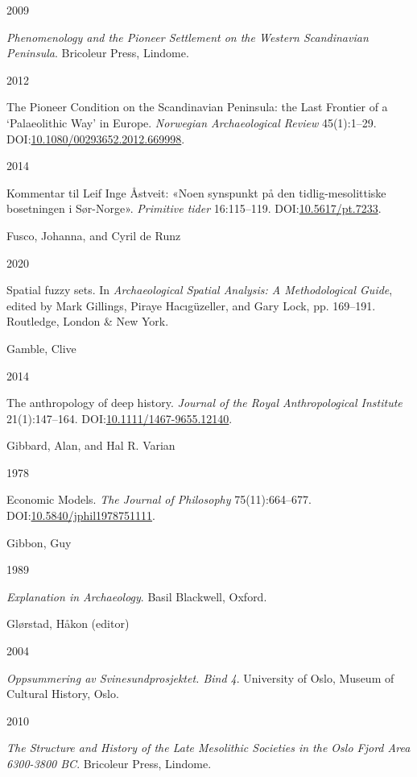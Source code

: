 \documentclass[
  a4paper,
  oneside]{uiophdthesis}
\newlength{\cslhangindent}
\newlength{\csllabelwidth}
\newlength{\cslentryspacingunit} %
\newenvironment{CSLReferences}[2] %
 {%
  \setlength{\parindent}{0pt}
  \ifodd #1
  \let\oldpar\par
  \def\par{\hangindent=\cslhangindent\oldpar}
  \fi
  \setlength{\parskip}{#2\cslentryspacingunit}
 }%
 {}
\newcommand{\CSLBlock}[1]{#1\hfill\break}
\newcommand{\CSLLeftMargin}[1]{\parbox[t]{\csllabelwidth}{#1}}
\newcommand{\CSLRightInline}[1]{\parbox[t]{\linewidth - \csllabelwidth}{#1}\break}
\begin{document}
\begin{CSLReferences}{0}{0}
\leavevmode{}%
\CSLLeftMargin{ 2009 }
\CSLRightInline{\emph{{Phenomenology and the Pioneer Settlement on the Western Scandinavian Peninsula}}. Bricoleur Press, Lindome.}

\leavevmode{}%
\CSLLeftMargin{ 2012 }
\CSLRightInline{{The Pioneer Condition on the Scandinavian Peninsula: the Last Frontier of a {`}Palaeolithic Way{'} in Europe}. \emph{Norwegian Archaeological Review} 45(1):1--29. DOI:\href{https://doi.org/10.1080/00293652.2012.669998}{10.1080/00293652.2012.669998}.}

\leavevmode{}%
\CSLLeftMargin{ 2014 }
\CSLRightInline{{Kommentar til Leif Inge Åstveit: «Noen synspunkt på den tidlig-mesolittiske bosetningen i Sør-Norge»}. \emph{Primitive tider} 16:115--119. DOI:\href{https://doi.org/10.5617/pt.7233}{10.5617/pt.7233}.}

\leavevmode{}%
\CSLBlock{Fusco, Johanna, and Cyril de Runz}
\CSLLeftMargin{ 2020}
\CSLRightInline{Spatial fuzzy sets. In \emph{{Archaeological Spatial Analysis: A Methodological Guide}}, edited by Mark Gillings, Piraye Hacıgüzeller, and Gary Lock, pp. 169--191. Routledge, London \& New York.}

\leavevmode{}%
\CSLBlock{Gamble, Clive}
\CSLLeftMargin{ 2014}
\CSLRightInline{{The anthropology of deep history}. \emph{Journal of the Royal Anthropological Institute} 21(1):147--164. DOI:\href{https://doi.org/10.1111/1467-9655.12140}{10.1111/1467-9655.12140}.}

\leavevmode{}%
\CSLBlock{Gibbard, Alan, and Hal R. Varian}
\CSLLeftMargin{ 1978}
\CSLRightInline{{Economic Models}. \emph{The Journal of Philosophy} 75(11):664--677. DOI:\href{https://doi.org/10.5840/jphil1978751111}{10.5840/jphil1978751111}.}

\leavevmode{}%
\CSLBlock{Gibbon, Guy}
\CSLLeftMargin{ 1989}
\CSLRightInline{\emph{{Explanation in Archaeology}}. Basil Blackwell, Oxford.}

\leavevmode{}%
\CSLBlock{Glørstad, Håkon (editor)}
\CSLLeftMargin{ 2004}
\CSLRightInline{\emph{{Oppsummering av Svinesundprosjektet. Bind 4}}. University of Oslo, Museum of Cultural History, Oslo.}

\leavevmode{}%
\CSLLeftMargin{ 2010 }
\CSLRightInline{\emph{{The Structure and History of the Late Mesolithic Societies in the Oslo Fjord Area 6300-3800 BC}}. Bricoleur Press, Lindome.}


\end{CSLReferences}
\end{document}

